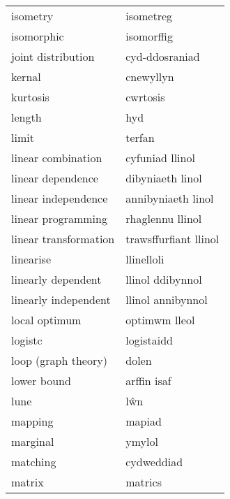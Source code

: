 \begin{supertabular}{p{0.22\textwidth}p{0.22\textwidth}}
                         isometry &                        isometreg \\
                       isomorphic &                       isomorffig \\
               joint distribution &                   cyd-ddosraniad \\
                           kernal &                        cnewyllyn \\
                         kurtosis &                         cwrtosis \\
                           length &                              hyd \\
                            limit &                           terfan \\
               linear combination &                  cyfuniad llinol \\
                linear dependence &                 dibyniaeth linol \\
              linear independence &               annibyniaeth linol \\
               linear programming &                 rhaglennu llinol \\
            linear transformation &            trawsffurfiant llinol \\
                        linearise &                       llinelloli \\
               linearly dependent &                 llinol ddibynnol \\
             linearly independent &                llinol annibynnol \\
                    local optimum &                    optimwm lleol \\
                          logistc &                       logistaidd \\
              loop (graph theory) &                            dolen \\
                      lower bound &                      arffin isaf \\
                             lune &                              lŵn \\
                          mapping &                           mapiad \\
                         marginal &                           ymylol \\
                         matching &                       cydweddiad \\
                           matrix &                          matrics \\

\end{supertabular}
